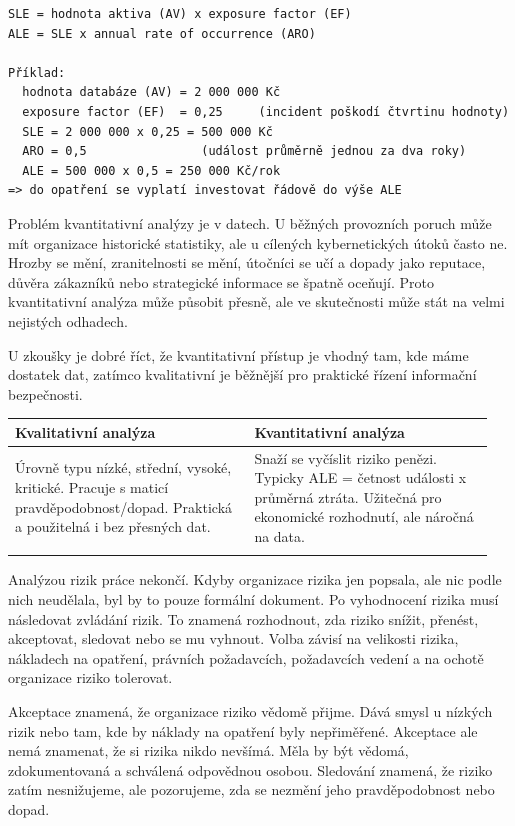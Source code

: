 \documentclass[11pt,a4paper]{article}
\begin{document}
\begin{codebox}
\small
\begin{verbatim}
SLE = hodnota aktiva (AV) x exposure factor (EF)
ALE = SLE x annual rate of occurrence (ARO)

Příklad:
  hodnota databáze (AV) = 2 000 000 Kč
  exposure factor (EF)  = 0,25     (incident poškodí čtvrtinu hodnoty)
  SLE = 2 000 000 x 0,25 = 500 000 Kč
  ARO = 0,5                (událost průměrně jednou za dva roky)
  ALE = 500 000 x 0,5 = 250 000 Kč/rok
=> do opatření se vyplatí investovat řádově do výše ALE
\end{verbatim}
\end{codebox}

Problém kvantitativní analýzy je v datech. U běžných provozních poruch může mít organizace historické statistiky, ale u cílených kybernetických útoků často ne. Hrozby se mění, zranitelnosti se mění, útočníci se učí a dopady jako reputace, důvěra zákazníků nebo strategické informace se špatně oceňují. Proto kvantitativní analýza může působit přesně, ale ve skutečnosti může stát na velmi nejistých odhadech.

U zkoušky je dobré říct, že kvantitativní přístup je vhodný tam, kde máme dostatek dat, zatímco kvalitativní je běžnější pro praktické řízení informační bezpečnosti.

\begin{longtable}{p{0.475\linewidth}p{0.475\linewidth}}
\toprule
\textbf{Kvalitativní analýza} & \textbf{Kvantitativní analýza} \\
\midrule\endhead
Úrovně typu nízké, střední, vysoké, kritické. Pracuje s maticí pravděpodobnost/dopad. Praktická a použitelná i bez přesných dat. & Snaží se vyčíslit riziko penězi. Typicky ALE = četnost události x průměrná ztráta. Užitečná pro ekonomické rozhodnutí, ale náročná na data. \\
\addlinespace
\bottomrule
\end{longtable}

Analýzou rizik práce nekončí. Kdyby organizace rizika jen popsala, ale nic podle nich neudělala, byl by to pouze formální dokument. Po vyhodnocení rizika musí následovat zvládání rizik. To znamená rozhodnout, zda riziko snížit, přenést, akceptovat, sledovat nebo se mu vyhnout. Volba závisí na velikosti rizika, nákladech na opatření, právních požadavcích, požadavcích vedení a na ochotě organizace riziko tolerovat.

Akceptace znamená, že organizace riziko vědomě přijme. Dává smysl u nízkých rizik nebo tam, kde by náklady na opatření byly nepřiměřené. Akceptace ale nemá znamenat, že si rizika nikdo nevšímá. Měla by být vědomá, zdokumentovaná a schválená odpovědnou osobou. Sledování znamená, že riziko zatím nesnižujeme, ale pozorujeme, zda se nezmění jeho pravděpodobnost nebo dopad.
\end{document}
